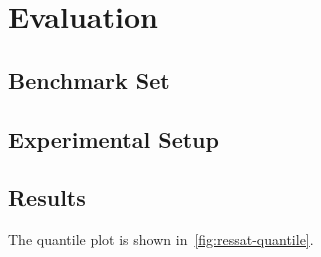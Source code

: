 \section{Evaluation}
\label{sect:ressat-evaluation}

\subsection{Benchmark Set}

\subsection{Experimental Setup}

\subsection{Results}

\begin{figure*}[t]
    \centering
    
    \caption{The quantile plot of strategic companies formulas}
    \label{fig:ressat-quantile}
\end{figure*}

The quantile plot is shown in~\cref{fig:ressat-quantile}.